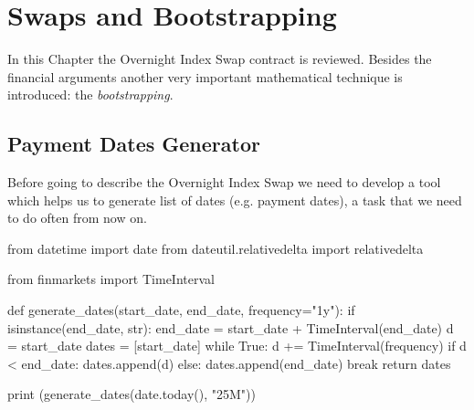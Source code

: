 \chapter{Swaps and Bootstrapping}\label{sec:swaps-and-bootstrapping}

In this Chapter the Overnight Index Swap contract is reviewed. Besides the financial arguments another very important mathematical technique is introduced: the \emph{bootstrapping}.

\section{Payment Dates Generator}
Before going to describe the Overnight Index Swap we need to develop a tool which helps us to generate list of dates (e.g. payment dates), a task that we need to do often from now on. 


\begin{ipython}
from datetime import date
from dateutil.relativedelta import relativedelta

from finmarkets import TimeInterval

def generate_dates(start_date, end_date, frequency="1y"):
    if isinstance(end_date, str):
        end_date = start_date + TimeInterval(end_date)
    d = start_date
    dates = [start_date]
    while True:
        d += TimeInterval(frequency)
        if d < end_date:
            dates.append(d)
        else:
            dates.append(end_date)
            break
    return dates
    
print (generate_dates(date.today(), "25M"))
\end{ipython}
\begin{ioutput}
\end{ioutput}


